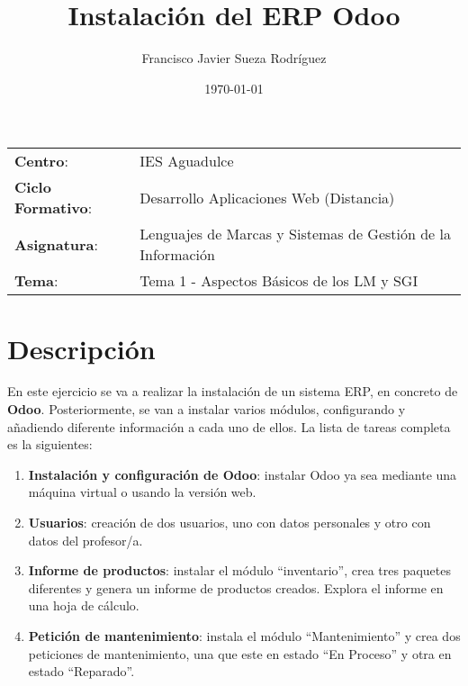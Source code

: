 


\title{
\normalfont \normalsize
\huge \textbf{Instalación del ERP Odoo}
}
\author{Francisco Javier Sueza Rodríguez}
\date{\normalsize\today}



\maketitle

\vspace{2ex}

\begin{center}
    \begin{tabular}{l l}
        \textbf{Centro}: & IES Aguadulce \\
        \textbf{Ciclo Formativo}: & Desarrollo Aplicaciones Web (Distancia)\\
        \textbf{Asignatura}: & Lenguajes de Marcas y Sistemas de Gestión de la Información\\
        \textbf{Tema}: & Tema 1 - Aspectos Básicos de los LM y SGI \\
    \end{tabular}
\end{center}

\vspace{10ex}

\section{Descripción}
En este ejercicio se va a realizar la instalación de un sistema ERP, en concreto de \textbf{Odoo}. Posteriormente, se van a instalar varios módulos, configurando y añadiendo diferente información a cada uno de ellos. La lista de tareas completa es la siguientes:

\begin{enumerate}
    \item \textbf{Instalación y configuración de Odoo}: instalar Odoo ya sea mediante una máquina virtual o usando la versión web.
    \item \textbf{Usuarios}: creación de dos usuarios, uno con datos personales y otro con datos del profesor/a.
    \item \textbf{Informe de productos}: instalar el módulo ``inventario'', crea tres paquetes diferentes y genera un informe de productos creados. Explora el informe en una hoja de cálculo.
    \item \textbf{Petición de mantenimiento}: instala el módulo ``Mantenimiento'' y crea dos peticiones de mantenimiento, una que este en estado ``En Proceso'' y otra en estado ``Reparado''.
\end{enumerate}

